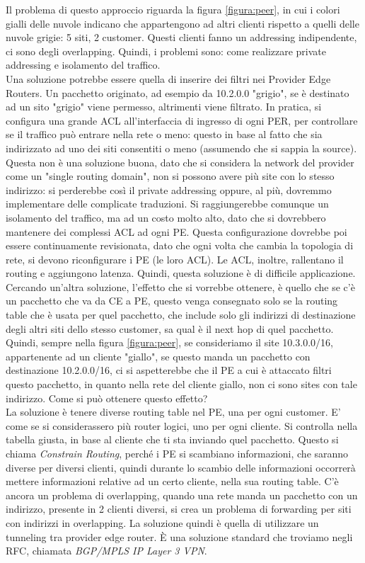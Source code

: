 \documentclass{article}
\begin{document}
Il problema di questo approccio riguarda la figura \ref{figura:peer}, in cui i colori gialli delle nuvole indicano che appartengono ad altri clienti rispetto a quelli delle nuvole grigie: 5 siti, 2 customer. Questi clienti fanno un addressing indipendente, ci sono degli overlapping. Quindi, i problemi sono: come realizzare private addressing e isolamento del traffico. \\ Una soluzione potrebbe essere quella di inserire dei filtri nei Provider Edge Routers. Un pacchetto originato, ad esempio da 10.2.0.0 "grigio", se è destinato ad un sito "grigio" viene permesso, altrimenti viene filtrato. In pratica, si configura una grande ACL all'interfaccia di ingresso di ogni PER, per controllare se il traffico può entrare nella rete o meno: questo in base al fatto che sia indirizzato ad uno dei siti consentiti o meno (assumendo che si sappia la source). Questa non è una soluzione buona, dato che si considera la network del provider come un "single routing domain", non si possono avere più site con lo stesso indirizzo: si perderebbe così il private addressing oppure, al più, dovremmo implementare delle complicate traduzioni. Si raggiungerebbe comunque un isolamento del traffico, ma ad un costo molto alto, dato che si dovrebbero mantenere dei complessi ACL ad ogni PE. Questa configurazione dovrebbe poi essere continuamente revisionata, dato che ogni volta che cambia la topologia di rete, si devono riconfigurare i PE (le loro ACL). Le ACL, inoltre, rallentano il routing e aggiungono latenza. Quindi, questa soluzione è di difficile applicazione. \\ Cercando un'altra soluzione, l'effetto che si vorrebbe ottenere, è quello che se c'è un pacchetto che va da CE a PE, questo venga consegnato solo se la routing table che è usata per quel pacchetto, che include solo gli indirizzi di destinazione degli altri siti dello stesso customer, sa qual è il next hop di quel pacchetto. Quindi, sempre nella figura \ref{figura:peer}, se consideriamo il site 10.3.0.0/16, appartenente ad un cliente "giallo", se questo manda un pacchetto con destinazione 10.2.0.0/16, ci si aspetterebbe che il PE a cui è attaccato filtri questo pacchetto, in quanto nella rete del cliente giallo, non ci sono sites con tale indirizzo. Come si può ottenere questo effetto? \\ La soluzione è tenere diverse routing table nel PE, una per ogni customer. E' come se si considerassero più router logici, uno per ogni cliente. Si controlla nella tabella giusta, in base al cliente che ti sta inviando quel pacchetto. Questo si chiama \textit{Constrain Routing}, perché i PE si scambiano informazioni, che saranno diverse per diversi clienti, quindi durante lo scambio delle informazioni occorrerà mettere informazioni relative ad un certo cliente, nella sua routing table. C'è ancora un problema di overlapping, quando una rete manda un pacchetto con un indirizzo, presente in 2 clienti diversi, si crea un problema di forwarding per siti con indirizzi in overlapping. La soluzione quindi è quella di utilizzare un tunneling tra provider edge router. È una soluzione standard che troviamo negli RFC, chiamata \textit{BGP/MPLS IP Layer 3 VPN}.
\end{document}
